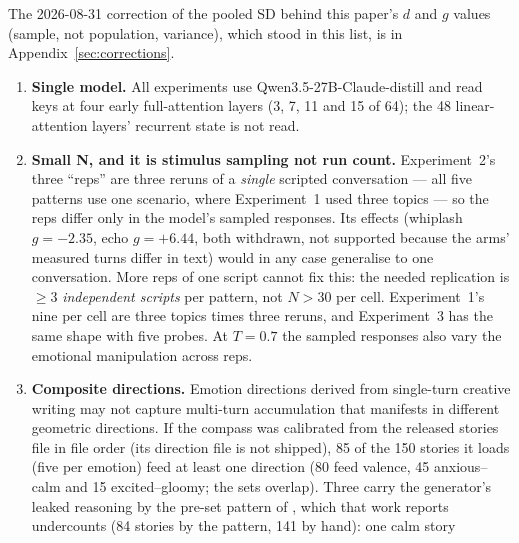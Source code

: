 \documentclass[11pt,a4paper]{article}
\begin{document}
The 2026-08-31 correction of the pooled SD behind this paper's $d$ and
$g$ values (sample, not population, variance), which stood in this
list, is in Appendix~\ref{sec:corrections}.

\begin{enumerate}[nosep]
    \item \label{lim:model}\textbf{Single model.} All experiments use Qwen3.5-27B-Claude-distill and
          read keys at four early full-attention layers (3, 7, 11 and 15 of
          64); the 48 linear-attention layers' recurrent state is not read.
    \item \label{lim:smalln}\textbf{Small N, and it is stimulus sampling not run count.}
          Experiment~2's three ``reps'' are three reruns of a \emph{single}
          scripted conversation --- all five patterns use one scenario, where
          Experiment~1 used three topics --- so the reps differ only in the
          model's sampled responses. Its effects (whiplash $g{=}-2.35$, echo
          $g{=}+6.44$, both withdrawn, not supported because the arms' measured turns differ
          in text) would in any case generalise to one conversation. More reps of
          one script cannot fix this: the needed replication is $\geq$3
          \emph{independent scripts} per pattern, not $N{>}30$ per cell.
          Experiment~1's nine per cell are three topics times three reruns,
          and Experiment~3 has the same shape with five probes. At $T{=}0.7$
          the sampled responses also vary the emotional manipulation across
          reps.
    \item \label{lim:directions}\textbf{Composite directions.} Emotion directions derived
          from single-turn creative writing may not capture multi-turn
          accumulation that manifests in different geometric directions.
          If the compass was calibrated from the released stories file in
          file order (its direction file is not shipped), 85 of the 150
          stories it loads (five per emotion) feed at least one direction
          (80 feed valence, 45 anxious--calm and 15 excited--gloomy; the
          sets overlap). Three carry the generator's leaked reasoning by the pre-set pattern of \citet{lyra2026usermodel}, which that work reports undercounts (84 stories by the pattern, 141 by hand): one calm story

\end{enumerate}
\end{document}

